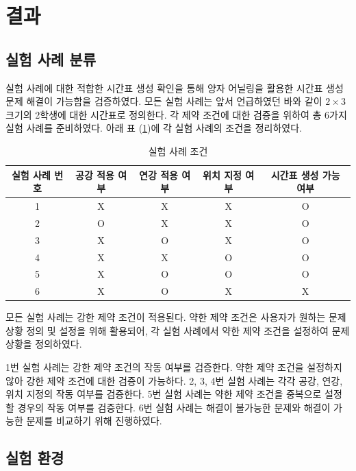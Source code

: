 \documentclass{article}
\begin{document}
    \section{결과}

    \subsection{실험 사례 분류}

실험 사례에 대한 적합한 시간표 생성 확인을 통해 양자 어닐링을 활용한 시간표 생성 문제 해결이 가능함을 검증하였다. 모든 실험 사례는 앞서 언급하였던 바와 같이 $2\times3$ 크기의 2학생에 대한 시간표로 정의한다. 각 제약 조건에 대한 검증을 위하여 총 6가지 실험 사례를 준비하였다. 아래 표 (\ref{tab:kindofcase})에 각 실험 사례의 조건을 정리하였다.

    \begin{table}[htb!]
        \centering
        \begin{tabular}{ c c c c c }
        \hline
        실험 사례 번호 & 공강 적용 여부 & 연강 적용 여부 & 위치 지정 여부 & 시간표 생성 가능 여부 \\
        \hline
        1 & X & X & X & O \\
        2 & O & X & X & O \\
        3 & X & O & X & O \\
        4 & X & X & O & O \\
        5 & X & O & O & O \\
        6 & X & O & X & X \\
        \hline
        \end{tabular}
        \caption{실험 사례 조건}\label{tab:kindofcase}
    \end{table}

모든 실험 사례는 강한 제약 조건이 적용된다. 약한 제약 조건은 사용자가 원하는 문제 상황 정의 및 설정을 위해 활용되어, 각 실험 사례에서 약한 제약 조건을 설정하여 문제 상황을 정의하였다.

1번 실험 사례는 강한 제약 조건의 작동 여부를 검증한다. 약한 제약 조건을 설정하지 않아 강한 제약 조건에 대한 검증이 가능하다. 2, 3, 4번 실험 사례는 각각 공강, 연강, 위치 지정의 작동 여부를 검증한다. 5번 실험 사례는 약한 제약 조건을 중복으로 설정할 경우의 작동 여부를 검증한다. 6번 실험 사례는 해결이 불가능한 문제와 해결이 가능한 문제를 비교하기 위해 진행하였다.

    \subsection{실험 환경}
\end{document}
